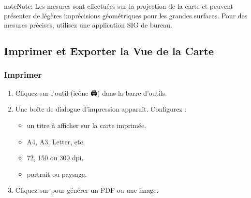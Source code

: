 \documentclass[letterpaper,10pt,english]{sphinxmanual}
\begin{document}
\begin{sphinxadmonition}{note}{Note:}
\sphinxAtStartPar
Les mesures sont effectuées sur la projection de la carte et peuvent présenter de
légères imprécisions géométriques pour les grandes surfaces. Pour des mesures
précises, utilisez une application SIG de bureau.
\end{sphinxadmonition}


\subsection{Imprimer et Exporter la Vue de la Carte}
\label{\detokenize{fr/04_explorer_cartes:imprimer-et-exporter-la-vue-de-la-carte}}

\subsubsection{Imprimer}
\label{\detokenize{fr/04_explorer_cartes:imprimer}}\begin{enumerate}
%
\item {} 
\sphinxAtStartPar
Cliquez sur l’outil  (icône 🖨) dans la barre d’outils.

\item {} 
\sphinxAtStartPar
Une boîte de dialogue d’impression apparaît. Configurez :
\begin{itemize}
\item {} 
\sphinxAtStartPar
{} \textendash{} un titre à afficher sur la carte imprimée.

\item {} 
\sphinxAtStartPar
{} \textendash{} A4, A3, Letter, etc.

\item {} 
\sphinxAtStartPar
{} \textendash{} 72, 150 ou 300 dpi.

\item {} 
\sphinxAtStartPar
{} \textendash{} portrait ou paysage.

\end{itemize}

\item {} 
\sphinxAtStartPar
Cliquez sur  pour générer un PDF ou une image.

\end{enumerate}
\end{document}
